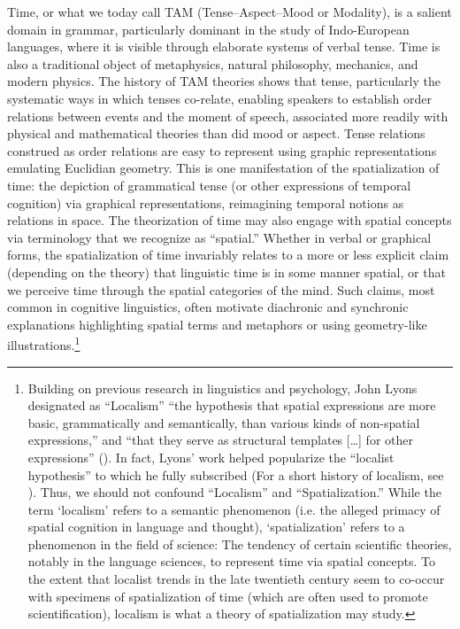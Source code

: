 \documentclass[english,output=paper,colorlinks,citecolor=brown]{../langscibook}
\begin{document}
Time, or what we today call TAM (Tense–Aspect–Mood or Modality), is a salient domain in grammar, particularly dominant in the study of Indo-European languages, where it is visible through elaborate systems of verbal tense. Time is also a traditional object of metaphysics, natural philosophy, mechanics, and modern physics. The history of TAM theories shows that tense, particularly the systematic ways in which tenses co-relate, enabling speakers to establish order relations between events and the moment of speech, associated more readily with physical and mathematical theories than did mood or aspect. Tense relations construed as order relations are easy to represent using graphic representations emulating Euclidian geometry. This is one manifestation of the spatialization of time: the depiction of grammatical tense (or other expressions of temporal cognition) via graphical representations, reimagining temporal notions as relations in space. The theorization of time may also engage with spatial concepts via terminology that we recognize as “spatial.” Whether in verbal or graphical forms, the spatialization of time invariably relates to a more or less explicit claim (depending on the theory) that linguistic time is in some manner spatial, or that we perceive time through the spatial categories of the mind. Such claims, most common in cognitive linguistics, often motivate diachronic and synchronic explanations highlighting spatial terms and metaphors or using geometry-like illustrations.\footnote{Building on previous research in linguistics and psychology, John Lyons designated as “Localism” “the hypothesis that spatial expressions are more basic, grammatically and semantically, than various kinds of non-spatial expressions,” and “that they serve as structural templates […] for other expressions” (\citeyear[718]{Lyons1977}). In fact, Lyons’ work helped popularize the “localist hypothesis” to which he fully subscribed (For a short history of localism, see \citealt{Fortis2018Anderson}). Thus, we should not confound “Localism” and “Spatialization.” While the term ‘localism’ refers to a semantic phenomenon (i.e. the alleged primacy of spatial cognition in language and thought), ‘spatialization’ refers to a phenomenon in the field of science: The tendency of certain scientific theories, notably in the language sciences, to represent time via spatial concepts. To the extent that localist trends in the late twentieth century seem to co-occur with specimens of spatialization of time (which are often used to promote scientification), localism is what a theory of spatialization may study.}
\end{document}
